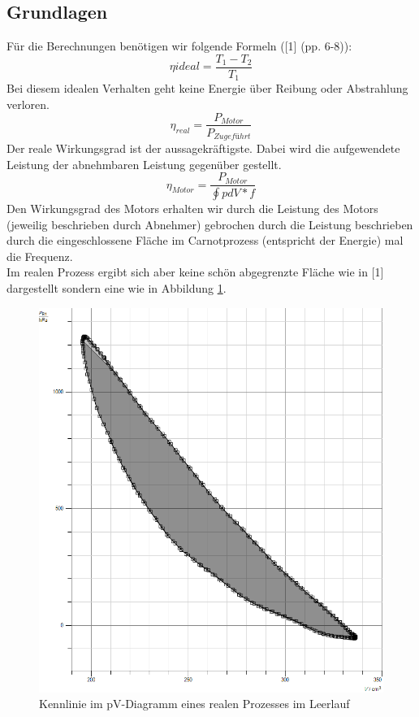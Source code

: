 \documentclass[12pt,a4paper]{article}
\begin{document}
\begin{multicols}{2}
\subsection{Grundlagen}
Für die Berechnungen benötigen wir folgende Formeln ([1] (pp. 6-8)):\\
$$\eta{ideal} = \frac{T_1 - T_2}{T_1}$$
Bei diesem idealen Verhalten geht keine Energie über Reibung oder Abstrahlung verloren.
$$\eta_{real} = \frac{P_{Motor}}{P_{Zugeführt}}$$
Der reale Wirkungsgrad ist der aussagekräftigste. Dabei wird die aufgewendete Leistung der abnehmbaren Leistung gegenüber gestellt.
$$\eta_{Motor} = \frac{P_{Motor}}{\oint p dV * f}$$
Den Wirkungsgrad des Motors erhalten wir durch die Leistung des Motors (jeweilig beschrieben durch Abnehmer) gebrochen durch die Leistung beschrieben durch die eingeschlossene Fläche im Carnotprozess (entspricht der Energie) mal die Frequenz. 
\\
Im realen Prozess ergibt sich aber keine schön abgegrenzte Fläche wie in [1] dargestellt sondern eine wie in Abbildung \ref{fig:real_carnot}.

\begin{figure}[H]
	\centering
	\includegraphics[scale=0.25]{./data/kennlinie_stirling_ohnelast.png}
	\caption{Kennlinie im pV-Diagramm eines realen Prozesses im Leerlauf}
	\label{fig:real_carnot}
\end{figure}


\end{multicols}
\end{document}
